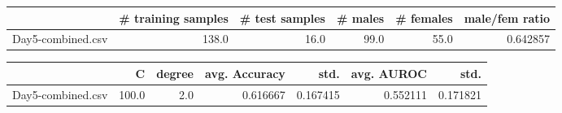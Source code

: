 \begin{tabular}{lrrrrr}
\hline
{} &  \# training samples &  \# test samples &  \# males &  \# females &  male/fem ratio \\
\hline
Day5-combined.csv &               138.0 &            16.0 &     99.0 &       55.0 &        0.642857 \\
\hline
\end{tabular}
\begin{tabular}{lrrrrrr}
\hline
{} &      C &  degree &  avg. Accuracy &      std. &  avg. AUROC &      std. \\
\hline
Day5-combined.csv &  100.0 &     2.0 &       0.616667 &  0.167415 &    0.552111 &  0.171821 \\
\hline
\end{tabular}

